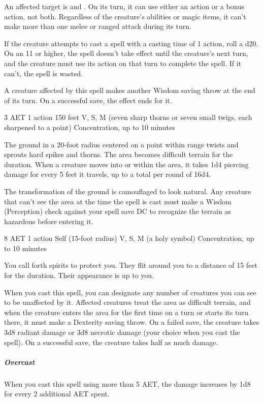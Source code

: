 An affected target is  and . On its turn, it can use either an action or a bonus action, not both. Regardless of the creature's abilities or magic items, it can't make more than one melee or ranged attack during its turn.

If the creature attempts to cast a spell with a casting time of 1 action, roll a d20. On an 11 or higher, the spell doesn't take effect until the creature's next turn, and the creature must use its action on that turn to complete the spell. If it can't, the spell is wasted.

A creature affected by this spell makes another Wisdom saving throw at the end of its turn. On a successful save, the effect ends for it.


{3 AET}
{1 action}
{150 feet}
{V, S, M (seven sharp thorns or seven small twigs, each sharpened to a point)}
{Concentration, up to 10 minutes}

The ground in a 20-foot radius centered on a point within range twists and sprouts hard spikes and thorns. The area becomes difficult terrain for the duration. When a creature moves into or within the area, it takes 1d4 piercing damage for every 5 feet it travels, up to a total per round of 16d4.

The transformation of the ground is camouflaged to look natural. Any creature that can't see the area at the time the spell is cast must make a Wisdom (Perception) check against your spell save DC to recognize the terrain as hazardous before entering it.


{8 AET}
{1 action}
{Self (15-foot radius)}
{V, S, M (a holy symbol)}
{Concentration, up to 10 minutes}

You call forth spirits to protect you. They flit around you to a distance of 15 feet for the duration. Their appearance is up to you.

When you cast this spell, you can designate any number of creatures you can see to be unaffected by it. Affected creatures treat the area as difficult terrain, and when the creature enters the area for the first time on a turn or starts its turn there, it must make a Dexterity saving throw. On a failed save, the creature takes 3d8 radiant damage or 3d8 necrotic damage (your choice when you cast the spell). On a successful save, the creature takes half as much damage.

\subparagraph*{Overcast} When you cast this spell using more than 5 AET, the damage increases by 1d8 for every 2 additional AET spent.


